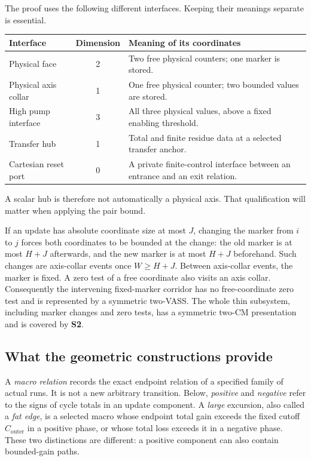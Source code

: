 \documentclass[11pt,a4paper]{article}
\theoremstyle{remark}
\newcommand{\Co}{C_{\mathrm{outer}}}
\begin{document}
The proof uses the following different interfaces. Keeping their
meanings separate is essential.
\begin{center}
\small
\begin{tabular}{@{}p{.24\linewidth}cp{.58\linewidth}@{}}
\toprule
Interface & Dimension & Meaning of its coordinates\\
\midrule
Physical face & 2 & Two free physical counters; one marker is stored.\\
Physical axis collar & 1 & One free physical counter; two bounded values are stored.\\
High pump interface & 3 & All three physical values, above a fixed enabling threshold.\\
Transfer hub & 1 & Total and finite residue data at a selected transfer anchor.\\
Cartesian reset port & 0 & A private finite-control interface between an entrance and an exit relation.\\
\bottomrule
\end{tabular}
\end{center}
A scalar hub is therefore not automatically a physical axis. That
qualification will matter when applying the pair bound.

If an update has absolute coordinate size at most \(J\), changing the
marker from \(i\) to \(j\) forces both coordinates to be bounded at the
change: the old marker is at most \(H+J\) afterwards, and the new marker
is at most \(H+J\) beforehand. Such changes are axis-collar events once
\(W\ge H+J\). Between axis-collar events, the marker is fixed. A zero
test of a free coordinate also visits an axis collar. Consequently the
intervening fixed-marker corridor has no free-coordinate zero test and
is represented by a symmetric two-VASS. The whole thin subsystem,
including marker changes and zero tests, has a symmetric two-CM
presentation and is covered by \textbf{S2}.

\subsection{What the geometric constructions provide}

A \emph{macro relation} records the exact endpoint relation of a specified
family of actual runs. It is not a new arbitrary transition. Below,
\emph{positive} and \emph{negative} refer to the signs of cycle totals
in an update component. A \emph{large} excursion, also called a
\emph{fat edge}, is a selected macro whose endpoint total gain exceeds
the fixed cutoff \(\Co\) in a positive phase, or whose total loss
exceeds it in a negative phase. These two distinctions are different:
a positive component can also contain bounded-gain paths.
\end{document}
